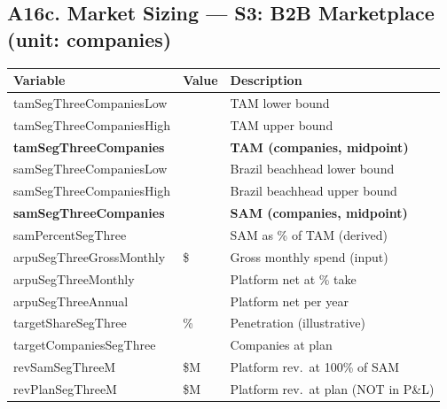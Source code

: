 \medskip
\subsection*{A16c. Market Sizing --- S3: B2B Marketplace (unit: companies)}
\begin{tabularx}{\linewidth}{l Y X}
\toprule
\textbf{Variable} & \textbf{Value} & \textbf{Description} \\\midrule
tamSegThreeCompaniesLow & \numint{\tamSegThreeCompaniesLow} & TAM lower bound \\
tamSegThreeCompaniesHigh & \numint{\tamSegThreeCompaniesHigh} & TAM upper bound \\
\textbf{tamSegThreeCompanies} & \textbf{\validateint{\tamSegThreeCompanies}{\HCtamSegThreeCompanies}} & \textbf{TAM (companies, midpoint)} \\
samSegThreeCompaniesLow & \numint{\samSegThreeCompaniesLow} & Brazil beachhead lower bound \\
samSegThreeCompaniesHigh & \numint{\samSegThreeCompaniesHigh} & Brazil beachhead upper bound \\
\textbf{samSegThreeCompanies} & \textbf{\validateint{\samSegThreeCompanies}{\HCsamSegThreeCompanies}} & \textbf{SAM (companies, midpoint)} \\
samPercentSegThree & \validatepct{\samPercentSegThree}{\HCsamPercentSegThree} & SAM as \% of TAM (derived) \\
arpuSegThreeGrossMonthly & \$\numint{\arpuSegThreeGrossMonthly} & Gross monthly spend (input) \\
arpuSegThreeMonthly & \validatemoney{\arpuSegThreeMonthly}{\HCarpuSegThreeMonthly} & Platform net at \numint{\markPlatformFeePercent}\% take \\
arpuSegThreeAnnual & \validatemoney{\arpuSegThreeAnnual}{\HCarpuSegThreeAnnual} & Platform net per year \\
targetShareSegThree & \numint{\targetShareSegThree}\% & Penetration (illustrative) \\
targetCompaniesSegThree & \validateint{\targetCompaniesSegThree}{\HCtargetCompaniesSegThree} & Companies at plan \\
revSamSegThreeM & \$\validate{\revSamSegThreeM}{\HCrevSamSegThreeM}M & Platform rev.\ at 100\% of SAM \\
revPlanSegThreeM & \$\validate{\revPlanSegThreeM}{\HCrevPlanSegThreeM}M & Platform rev.\ at plan (NOT in P\&L) \\
\bottomrule
\end{tabularx}

